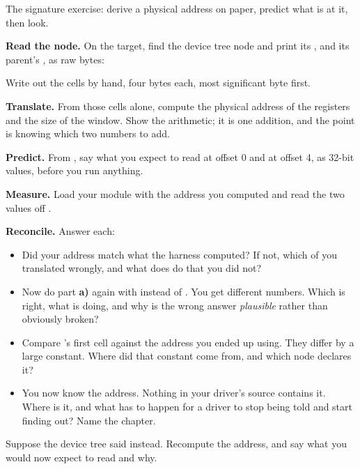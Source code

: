 The signature exercise: derive a physical address on paper, predict what is at it, then look.

 \textbf{Read the node.} On the target, find the device tree node and print its ,
and its parent's , as raw bytes:


\noindent Write out the cells by hand, four bytes each, most significant byte first.

 \textbf{Translate.} From those cells alone, compute the physical address of the registers
and the size of the window. Show the arithmetic; it is one addition, and the point is knowing which
two numbers to add.

 \textbf{Predict.} From , say what you expect to read at
offset 0 and at offset 4, as 32-bit values, before you run anything.

 \textbf{Measure.} Load your module with the address you computed and read the two values
off .

 \textbf{Reconcile.} Answer each:
\begin{itemize}
  \item Did your address match what the harness computed? If not, which of you translated wrongly,
    and what does  do that you did not?
  \item Now do part \textbf{a)} again with  instead of . You get
    different numbers. Which is right, what is  doing, and why is the wrong answer
    \emph{plausible} rather than obviously broken?
  \item Compare 's first cell against the address you ended up using. They differ by a
    large constant. Where did that constant come from, and which node declares it?
  \item You now know the address. Nothing in your driver's source contains it. Where is it, and what
    has to happen for a driver to stop being told and start finding out? Name the chapter.
\end{itemize}

 Suppose the device tree said  instead. Recompute the address,
and say what you would now expect  to read and why.
